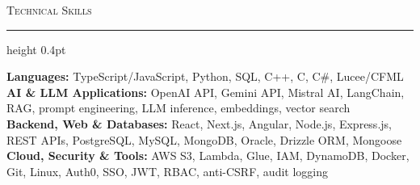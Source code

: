 \documentclass[letterpaper,11pt]{article}
\newcommand{\resumesection}[1]{%
  \par\vspace{2pt}%
  {\large\scshape #1}\par\vspace{2pt}%
  \hrule height 0.4pt\vspace{2pt}%
}
\begin{document}
\resumesection{Technical Skills}
\textbf{Languages:} TypeScript/JavaScript, Python, SQL, C++, C, C\#, Lucee/CFML\\
\textbf{AI \& LLM Applications:} OpenAI API, Gemini API, Mistral AI, LangChain, RAG, prompt engineering, LLM inference, embeddings, vector search\\
\textbf{Backend, Web \& Databases:} React, Next.js, Angular, Node.js, Express.js, REST APIs, PostgreSQL, MySQL, MongoDB, Oracle, Drizzle ORM, Mongoose\\
\textbf{Cloud, Security \& Tools:} AWS S3, Lambda, Glue, IAM, DynamoDB, Docker, Git, Linux, Auth0, SSO, JWT, RBAC, anti-CSRF, audit logging
\end{document}
